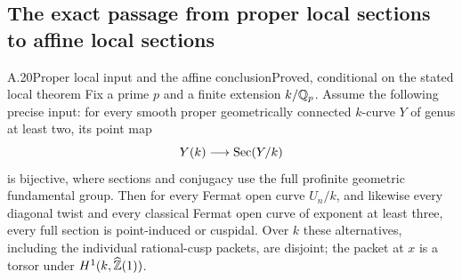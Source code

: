 \subsection{The exact passage from proper local sections to affine local sections}

\begin{statement}{A.20}{Proper local input and the affine conclusion}{Proved, conditional on the stated local theorem}
Fix a prime $p$ and a finite extension $k/\mathbb Q_p$. Assume the following precise input: for every smooth proper geometrically connected $k$-curve $Y$ of genus at least two, its point map
\[
Y(k)\longrightarrow\operatorname{Sec}(Y/k)
\]
is bijective, where sections and conjugacy use the full profinite geometric fundamental group. Then for every Fermat open curve $U_n/k$, and likewise every diagonal twist and every classical Fermat open curve of exponent at least three, every full section is point-induced or cuspidal. Over $k$ these alternatives, including the individual rational-cusp packets, are disjoint; the packet at $x$ is a torsor under $H^1(k,\widehat{\mathbb Z}(1))$.
\end{statement}
